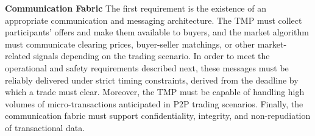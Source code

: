 \documentclass[sigplan]{acmart}
\begin{document}


\textbf{Communication Fabric}
The first requirement is the existence of an appropriate communication and messaging architecture. The TMP must collect participants' offers and make them available to buyers, and the market algorithm must communicate clearing prices, buyer-seller matchings, or other market-related signals depending on the trading scenario. In order to meet the operational and safety requirements described next, these messages must be reliably delivered under strict timing constraints, derived from the deadline by which a trade must clear. Moreover, the TMP must be capable of handling high volumes of micro-transactions anticipated in P2P trading scenarios.  Finally, the communication fabric must support confidentiality, integrity, and non-repudiation of transactional data.
\end{document}
